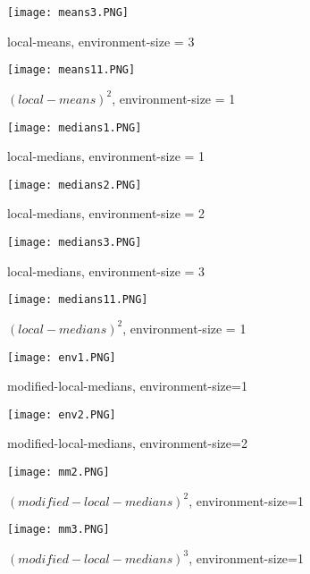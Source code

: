 \documentclass{article}
\begin{document}
\begin{figure}
  \centering
  \texttt{[image: means3.PNG]}
  \caption{local-means, environment-size = 3}
\end{figure}

\begin{figure}
  \centering
  \texttt{[image: means11.PNG]}
  \caption{$(local-means)^2$, environment-size = 1}
\end{figure}

\begin{figure}
  \centering
  \texttt{[image: medians1.PNG]}
  \caption{local-medians, environment-size = 1}
\end{figure}

\begin{figure}
  \centering
  \texttt{[image: medians2.PNG]}
  \caption{local-medians, environment-size = 2}
\end{figure}

\begin{figure}
  \centering
  \texttt{[image: medians3.PNG]}
  \caption{local-medians, environment-size = 3}
\end{figure}

\begin{figure}
  \centering
  \texttt{[image: medians11.PNG]}
  \caption{$(local-medians)^2$, environment-size = 1}
\end{figure}


\begin{figure}
  \centering
  \texttt{[image: env1.PNG]}
  \caption{modified-local-medians, environment-size=1}
\end{figure}

\begin{figure}
  \centering
  \texttt{[image: env2.PNG]}
  \caption{modified-local-medians, environment-size=2}
\end{figure}

\begin{figure}
  \centering
  \texttt{[image: mm2.PNG]}
  \caption{$(modified-local-medians)^2$, environment-size=1}
\end{figure}

\begin{figure}
  \centering
  \texttt{[image: mm3.PNG]}
  \caption{$(modified-local-medians)^3$, environment-size=1}
\end{figure}

\end{document}
